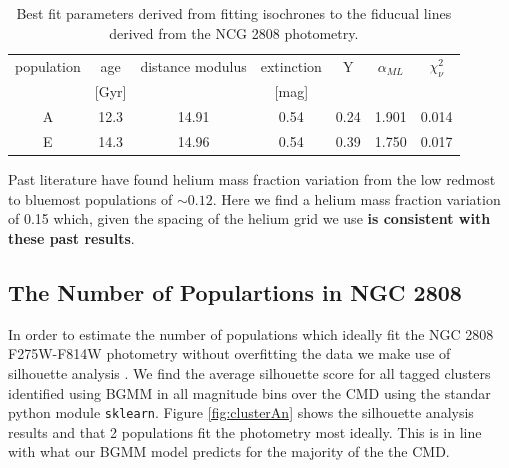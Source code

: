 \begin{table}
  \centering
  \begin{tabular}{c | c c c c c c}
    \hline
    population & age & distance modulus & extinction & Y & $\alpha_{ML}$ & $\chi^{2}_{\nu}$\\
    & [Gyr] & & [mag] & & &\\
    \hline
    \hline
    A & 12.3 & 14.91 & 0.54 & 0.24 & 1.901 & 0.014\\
    E & 14.3 & 14.96 & 0.54 & 0.39 & 1.750 & 0.017 \\
    \hline
  \end{tabular}
  \label{tab:BestFitResults}
  \caption{Best fit parameters derived from fitting isochrones to the fiducual lines derived from the NCG 2808 photometry.}
\end{table}


Past literature \citep[e.g. ][]{Milone2015, Milone2018} have found helium mass fraction variation from the low redmost to bluemost populations of $\sim 0.12$. Here we find a helium mass fraction variation of 0.15 which, given the spacing of the helium grid we use \textbf{is consistent with these past results}.

\subsection{The Number of Populartions in NGC 2808}
In order to estimate the number of populations which ideally fit the NGC 2808
F275W-F814W photometry without overfitting the data we make use of silhouette
analysis \citep[][and in a similar manner to how \citet{Valle2022}
preform their analysis of spectroscopic data]{ROUSSEEUW198753}. We find the average silhouette score for all tagged
clusters identified using BGMM in all magnitude bins over the CMD using the
standar python module \texttt{sklearn}. Figure \ref{fig:clusterAn} shows the
silhouette analysis results and that 2 populations fit the photometry most
ideally. This is in line with what our BGMM model predicts for the majority of
the the CMD.

